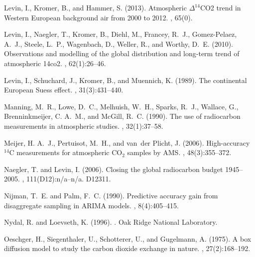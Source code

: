 \documentclass[a4paper, 11pt]{article}
\begin{document}
\begin{thebibliography}{}
Levin, I., Kromer, B., and Hammer, S. (2013).
\newblock Atmospheric {$\Delta^{14}$CO2} trend in {Western European} background
  air from 2000 to 2012.
, 65(0).

Levin, I., Naegler, T., Kromer, B., Diehl, M., Francey, R.~J., Gomez-Pelaez,
  A.~J., Steele, L.~P., Wagenbach, D., Weller, R., and Worthy, D.~E. (2010).
\newblock Observations and modelling of the global distribution and long-term
  trend of atmospheric 14co2.
, 62(1):26--46.

Levin, I., Schuchard, J., Kromer, B., and Muennich, K. (1989).
\newblock The continental {European Suess} effect.
, 31(3):431--440.

Manning, M.~R., Lowe, D.~C., Melhuish, W.~H., Sparks, R.~J., Wallace, G.,
  Brenninkmeijer, C. A.~M., and McGill, R.~C. (1990).
\newblock The use of radiocarbon measurements in atmospheric studies.
, 32(1):37--58.

Meijer, H. A.~J., Pertuisot, M.~H., and van~der Plicht, J. (2006).
\newblock High-accuracy {$^{14}$C} measurements for atmospheric {CO$_2$}
  samples by {AMS}.
, 48(3):355--372.

Naegler, T. and Levin, I. (2006).
\newblock Closing the global radiocarbon budget 1945--2005.
,
  111(D12):n/a--n/a.
\newblock D12311.

Nijman, T.~E. and Palm, F.~C. (1990).
\newblock Predictive accuracy gain from disaggregate sampling in {ARIMA}
  models.
, 8(4):405--415.

Nydal, R. and Loevseth, K. (1996).
.
\newblock Oak Ridge National Laboratory.

Oeschger, H., Siegenthaler, U., Schotterer, U., and Gugelmann, A. (1975).
\newblock A box diffusion model to study the carbon dioxide exchange in nature.
, 27(2):168--192.


\end{thebibliography}
\end{document}
